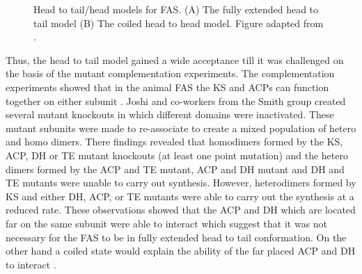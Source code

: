 		 	\setlength\fboxsep{5pt}
		 	\setlength\fboxrule{1.5pt}
		 	\begin{figure} [htbp]
		 	\centering
		 	\caption[Head to tail/head models for FAS]{Head to tail/head models for FAS. (A) The fully extended head to tail model (B) The coiled head to head model. Figure adapted from \textcite{Smith2007}. }
		 	\label{fig:headandtail}
		 	\end{figure}
		 				
					
			Thus, the head to tail model gained a wide acceptance till it was challenged on the basis of the mutant complementation experiments. The complementation experiments showed that in the animal FAS the KS and ACPs can function together on either subunit \parencite{Witkowski1996}. Joshi and co-workers from the Smith group created several mutant knockouts in which different domains were inactivated. These mutant subunits were made to re-associate to create a mixed population of hetero and homo dimers. There findings revealed that homodimers formed by the KS, ACP, DH or TE mutant knockouts (at least one point mutation) and the hetero dimers formed by the ACP and TE mutant, ACP and DH mutant and DH and TE mutants were unable to carry out synthesis. However, heterodimers formed by KS and either DH, ACP, or TE mutants were able to carry out the synthesis at a reduced rate. These observations showed that the ACP and DH which are located far on the same subunit were able to interact which suggest that it was not necessary for the FAS to be in fully extended head to tail conformation. On the other hand a coiled state would explain the ability of the far placed ACP and DH to interact \parencite{Joshi1997,Joshi1998}.
		 	
